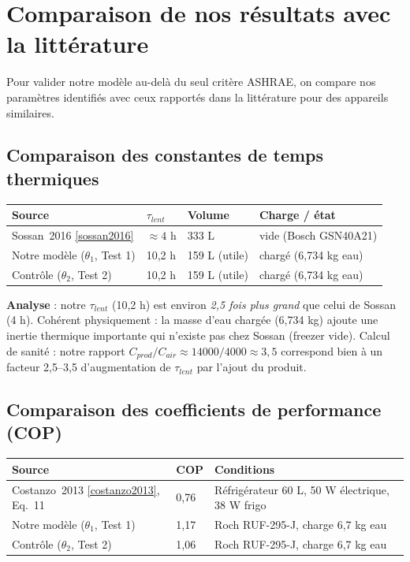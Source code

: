 \documentclass[11pt,a4paper]{article}
\begin{document}
\section{Comparaison de nos résultats avec la littérature}\label{sec:comparaison_litterature}

Pour valider notre modèle au-delà du seul critère ASHRAE, on compare nos paramètres
identifiés avec ceux rapportés dans la littérature pour des appareils similaires.

\subsection{Comparaison des constantes de temps thermiques}

\begin{center}
\renewcommand{\arraystretch}{1.3}
\begin{tabular}{p{4cm}p{2.5cm}p{2.5cm}p{4cm}}
\toprule
\textbf{Source} & \textbf{$\tau_{lent}$} & \textbf{Volume} & \textbf{Charge / état} \\
\midrule
Sossan~2016 \ref{sossan2016} & $\approx 4$ h & 333 L & vide (Bosch GSN40A21) \\
Notre modèle ($\theta_1$, Test 1) & 10,2 h & 159 L (utile) & chargé (6,734 kg eau) \\
Contrôle ($\theta_2$, Test 2) & 10,2 h & 159 L (utile) & chargé (6,734 kg eau) \\
\bottomrule
\end{tabular}
\end{center}

\textbf{Analyse} : notre $\tau_{lent}$ (10,2 h) est environ \emph{2,5 fois plus grand} que
celui de Sossan (4 h). Cohérent physiquement : la masse d'eau chargée (6,734 kg) ajoute une
inertie thermique importante qui n'existe pas chez Sossan (freezer vide). Calcul de
sanité : notre rapport $C_{prod}/C_{air} \approx 14000/4000 \approx 3{,}5$ correspond bien
à un facteur 2,5--3,5 d'augmentation de $\tau_{lent}$ par l'ajout du produit.

\subsection{Comparaison des coefficients de performance (COP)}

\begin{center}
\renewcommand{\arraystretch}{1.3}
\begin{tabular}{p{4cm}p{2cm}p{6cm}}
\toprule
\textbf{Source} & \textbf{COP} & \textbf{Conditions} \\
\midrule
Costanzo~2013 \ref{costanzo2013}, Eq.~11 & 0,76 & Réfrigérateur 60 L, 50 W électrique, 38 W frigo \\
Notre modèle ($\theta_1$, Test 1) & 1,17 & Roch RUF-295-J, charge 6,7 kg eau \\
Contrôle ($\theta_2$, Test 2) & 1,06 & Roch RUF-295-J, charge 6,7 kg eau \\
\bottomrule
\end{tabular}
\end{center}
\end{document}
